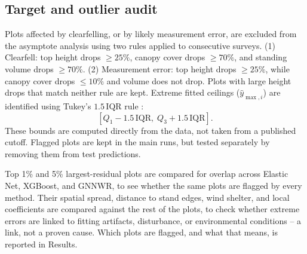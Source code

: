\subsection*{Target and outlier audit}
Plots affected by clearfelling, or by likely measurement error, are excluded from the asymptote analysis using two rules applied to consecutive surveys. (1) Clearfell: top height drops $\ge 25\%$, canopy cover drops $\ge 70\%$, and standing volume drops $\ge 70\%$. (2) Measurement error: top height drops $\ge 25\%$, while canopy cover drops $\le 10\%$ and volume does not drop. Plots with large height drops that match neither rule are kept. Extreme fitted ceilings ($\hat{y}_{\max,i}$) are identified using Tukey's $1.5\,\mathrm{IQR}$ rule \cite{tukey1977Exploratory_C5_EVAL}: %
\begin{equation}
\left[Q_1 - 1.5\,\mathrm{IQR},\; Q_3 + 1.5\,\mathrm{IQR}\right].
\label{eq:tukey-fences}
\end{equation}
These bounds are computed directly from the data, not taken from a published cutoff.
Flagged plots are kept in the main runs, but tested separately by removing them from test predictions.

Top 1\% and 5\% largest-residual plots are compared for overlap across Elastic Net, XGBoost, and GNNWR, to see whether the same plots are flagged by every method. Their spatial spread, distance to stand edges, wind shelter, and local coefficients are compared against the rest of the plots, to check whether extreme errors are linked to fitting artifacts, disturbance, or environmental conditions -- a link, not a proven cause. Which plots are flagged, and what that means, is reported in Results.

